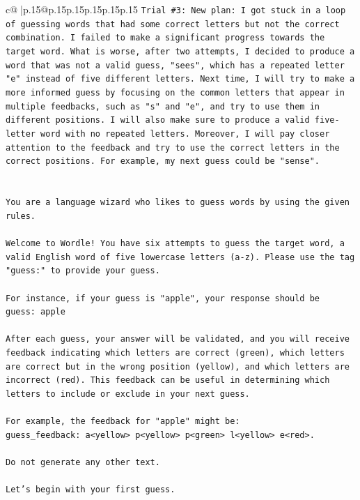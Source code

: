\documentclass{article}
\begin{document}
{\begin{supertabular}{c@{$\;$}|p{.15\linewidth}@{}p{.15\linewidth}p{.15\linewidth}p{.15\linewidth}p{.15\linewidth}p{.15\linewidth}}
{{{\texttt{Trial \#3: New plan: I got stuck in a loop of guessing words that had some correct letters but not the correct combination. I failed to make a significant progress towards the target word. What is worse, after two attempts, I decided to produce a word that was not a valid guess, "sees", which has a repeated letter "e" instead of five different letters. Next time, I will try to make a more informed guess by focusing on the common letters that appear in multiple feedbacks, such as "s" and "e", and try to use them in different positions. I will also make sure to produce a valid five{-}letter word with no repeated letters. Moreover, I will pay closer attention to the feedback and try to use the correct letters in the correct positions. For example, my next guess could be "sense".} \\
\\ 
\\ 
\texttt{You are a language wizard who likes to guess words by using the given rules.} \\
\\ 
\texttt{Welcome to Wordle! You have six attempts to guess the target word, a valid English word of five lowercase letters (a{-}z). Please use the tag "guess:" to provide your guess.} \\
\\ 
\texttt{For instance, if your guess is "apple", your response should be} \\
\texttt{guess: apple} \\
\\ 
\texttt{After each guess, your answer will be validated, and you will receive feedback indicating which letters are correct (green), which letters are correct but in the wrong position (yellow), and which letters are incorrect (red). This feedback can be useful in determining which letters to include or exclude in your next guess.} \\
\\ 
\texttt{For example, the feedback for "apple" might be:} \\
\texttt{guess\_feedback: a<yellow> p<yellow> p<green> l<yellow> e<red>.} \\
\\ 
\texttt{Do not generate any other text.} \\
\\ 
\texttt{Let's begin with your first guess.} \\
            }
        }
    }
     \\ \\


\end{supertabular}}
\end{document}
